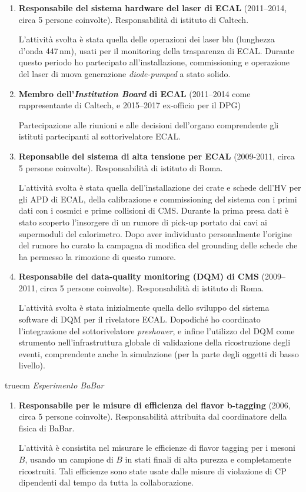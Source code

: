 \documentclass[11pt,twoside,a4paper]{article}
\begin{document}
\begin{enumerate}
\item \textbf{Responsabile del sistema hardware del laser di ECAL}
  (2011--2014, circa 5 persone coinvolte). Responsabilit\`a di
  istituto di Caltech.
  
  L'attivit\`a svolta \`e stata quella delle operazioni dei laser blu
  (lunghezza d'onda 447\,nm), usati per il monitoring della
  trasparenza di ECAL. Durante questo periodo ho partecipato
  all'installazione, commissioning e operazione del laser di nuova
  generazione \textit{diode-pumped} a stato solido.

\item \textbf{Membro dell'\textit{Institution Board} di ECAL}
  (2011--2014 come rappresentante di Caltech, e 2015--2017 ex-officio
  per il DPG)

  Partecipazione alle riunioni e alle decisioni dell'organo
  comprendente gli istituti partecipanti al sottorivelatore ECAL.
  
\item \textbf{Reponsabile del sistema di alta tensione per ECAL} (2009-2011,
  circa 5 persone coinvolte). Responsabilit\`a di istituto di Roma.
  
  L'attivit\`a svolta \`e stata quella dell'installazione dei crate e
  schede dell'HV per gli APD di ECAL, della calibrazione e
  commissioning del sistema con i primi dati con i cosmici e prime
  collisioni di CMS.  Durante la prima presa dati \`e stato scoperto
  l'insorgere di un rumore di pick-up portato dai cavi ai supermoduli
  del calorimetro. Dopo aver individuato personalmente l'origine del
  rumore ho curato la campagna di modifica del grounding delle schede
  che ha permesso la rimozione di questo rumore.
  
\item \textbf{Responsabile del data-quality monitoring (DQM) di CMS}
  (2009--2011, circa 5 persone coinvolte). Responsabilit\`a di
  istituto di Roma.
  
  L'attivit\`a svolta \`e stata inizialmente quella dello sviluppo del
  sistema software di DQM per il rivelatore ECAL. Dopodich\'e ho
  coordinato l'integrazione del sottorivelatore \textit{preshower}, e
  infine l'utilizzo del DQM come strumento nell'infrastruttura globale
  di validazione della ricostruzione degli eventi, comprendente anche
  la simulazione (per la parte degli oggetti di basso livello).
  
    
\end{enumerate}

 truecm
\textit{Esperimento BaBar}
\begin{enumerate}
\item \textbf{Responsabile per le misure di efficienza del flavor b-tagging}
  (2006, circa 5 persone coinvolte). Responsabilit\`a attribuita dal
  coordinatore della fisica di BaBar.

  L'attivit\`a \`e consistita nel misurare le efficienze di flavor
  tagging per i mesoni $B$, usando un campione di $B$ in stati finali
  di alta purezza e completamente ricostruiti. Tali efficienze sono
  state usate dalle misure di violazione di CP dipendenti dal tempo da
  tutta la collaborazione.
\end{enumerate}
\end{document}
